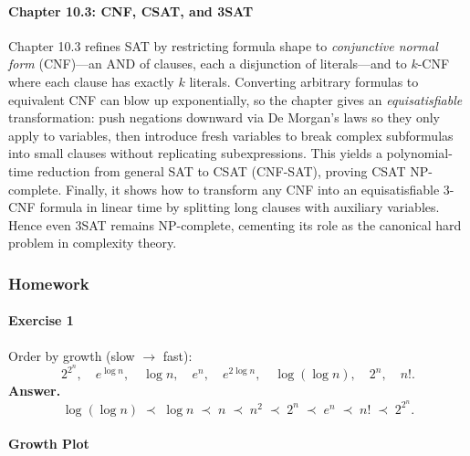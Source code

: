 \documentclass{article}
\theoremstyle{theorem}
\theoremstyle{definition}
\theoremstyle{remark}
\begin{document}
\paragraph*{Chapter 10.3: CNF, CSAT, and 3SAT}
Chapter 10.3 refines SAT by restricting formula shape to \emph{conjunctive normal form} (CNF)—an AND of clauses, each a disjunction of literals—and to \(k\)-CNF where each clause has exactly \(k\) literals. Converting arbitrary formulas to equivalent CNF can blow up exponentially, so the chapter gives an \emph{equisatisfiable} transformation: push negations downward via De Morgan’s laws so they only apply to variables, then introduce fresh variables to break complex subformulas into small clauses without replicating subexpressions. This yields a polynomial-time reduction from general SAT to CSAT (CNF-SAT), proving CSAT NP-complete. Finally, it shows how to transform any CNF into an equisatisfiable 3-CNF formula in linear time by splitting long clauses with auxiliary variables. Hence even 3SAT remains NP-complete, cementing its role as the canonical hard problem in complexity theory.

\subsubsection{Homework}
\paragraph*{Exercise 1}
Order by growth (slow \(\to\) fast):
\[
2^{2^n},\quad e^{\log n},\quad \log n,\quad e^n,\quad
e^{2\log n},\quad \log(\log n),\quad 2^n,\quad n!.
\]
\textbf{Answer.}
\[
\log(\log n)\;\prec\;\log n\;\prec\;n\;\prec\;n^2\;\prec\;2^n\;\prec\;e^n\;\prec\;n!\;\prec\;2^{2^n}.
\]

\newpage

\paragraph{Growth Plot}
\begin{center}
\end{center}
\end{document}
